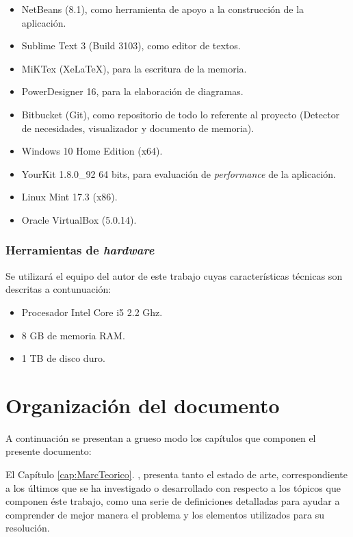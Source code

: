 \begin{itemize}
\item NetBeans (8.1), como herramienta de apoyo a la construcción de la aplicación.
\item Sublime Text 3 (Build 3103), como editor de textos.
\item MiKTex (XeLaTeX), para la escritura de la memoria.
\item PowerDesigner 16, para la elaboración de diagramas.
\item Bitbucket (Git), como repositorio de todo lo referente al proyecto (Detector de necesidades, visualizador y documento de memoria).
\item Windows 10 Home Edition (x64).
\item YourKit 1.8.0\_92 64 bits, para evaluación de \textit{performance} de la aplicación.
\item Linux Mint 17.3 (x86).
\item Oracle VirtualBox (5.0.14).
\end{itemize}

\subsubsection*{Herramientas de \textit{hardware}}
\label{subsubsec:HerrHardw}

Se utilizará el equipo del autor de este trabajo cuyas características técnicas son descritas a contunuación:
\begin{itemize}
\item Procesador Intel Core i5 2.2 Ghz.
\item 8 GB de memoria RAM.
\item 1 TB de disco duro.
\end{itemize}

\section{Organización del documento}
\label{intro:organizacion}

A continuación se presentan a grueso modo los capítulos que componen el presente documento:

El Capítulo \ref{cap:MarcTeorico}. , presenta tanto el estado de arte, correspondiente a los últimos que se ha investigado o desarrollado con respecto a los tópicos que componen éste trabajo, como una serie de definiciones detalladas para ayudar a comprender de mejor manera el problema y los elementos utilizados para su resolución.

